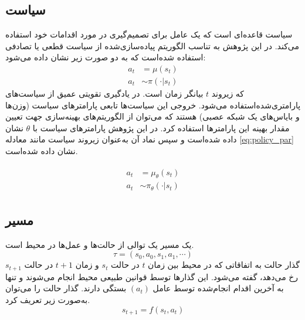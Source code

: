 \subsection{سیاست}
سیاست
  قاعده‌ای است که یک عامل برای تصمیم‌گیری در مورد اقدامات خود استفاده می‌کند. در این پژوهش به تناسب الگوریتم پیاده‌سازی‌شده از سیاست قطعی
 یا تصادفی
  استفاده شده‌است که به دو صورت زیر  نشان داده می‌شود:
  \begin{align}
  	a_t &= \mu(s_t)\\
  	a_t & \sim \pi(\cdot | s_t)
  \end{align}
  که زیروند \(t\)
   بیانگر زمان است.
  در یادگیری تقویتی عمیق از سیاست‌های پارامتری‌شده‌استفاده می‌شود. خروجی‌ این سیاست‌ها تابعی پارامترهای سیاست (وزن‌ها و بایاس‌های یک شبکه عصبی) هستند که می‌توان از الگوریتم‌های بهینه‌سازی جهت تعیین مقدار بهینه این پارامترها استفاده کرد.
  در این پژوهش پارامترهای سیاست با \( \theta\) نشان داده شده‌است و سپس نماد آن به‌عنوان زیروند سیاست مانند معادله \eqref{eq:policy_par} نشان داده شده‌است.
  
\begin{align}
	 \begin{split} 	 
 	a_t &= \mu_{\theta}(s_t) \\
 		a_t & \sim \pi_{\theta}(\cdot | s_t)
 	 \end{split}
 	 	\label{eq:policy_par}
\end{align}
\subsection{مسیر}
یک مسیر
 یک توالی از حالت‌ها و عمل‌ها در محیط است.
 \begin{equation}
		 \tau = (s_0, a_0, s_1, a_1, \cdots)
 \end{equation}
  گذار حالت
   به اتفاقاتی که در محیط بین 
   زمان \(t\)
   در حالت \(s_t\)
   و
      زمان
       \(t+1\)
   در حالت
    \(s_{t+1}\)
   رخ می‌دهد، گفته می‌شود. این گذارها توسط قوانین طبیعی محیط انجام می‌شوند و تنها به آخرین اقدام انجام‌شده توسط عامل \((a_t)\) بستگی دارند. گذار حالت را می‌توان به‌صورت زیر تعریف کرد.
   \begin{equation}
   	s_{t+1} = f(s_t, a_t)
   \end{equation}
  
  
